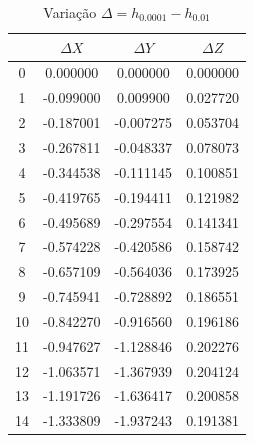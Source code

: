\documentclass[12pt, a4paper]{article}
\begin{document}
    \begin{table}[H]
        \centering
        \footnotesize
        \begin{tabular}{|c|c|c|c|}
        \toprule
            & $\Delta X$ & $\Delta Y$ & $\Delta Z$ \\
        \midrule
        0 & 0.000000 & 0.000000 & 0.000000 \\
        1 & -0.099000 & 0.009900 & 0.027720 \\
        2 & -0.187001 & -0.007275 & 0.053704 \\
        3 & -0.267811 & -0.048337 & 0.078073 \\
        4 & -0.344538 & -0.111145 & 0.100851 \\
        5 & -0.419765 & -0.194411 & 0.121982 \\
        6 & -0.495689 & -0.297554 & 0.141341 \\
        7 & -0.574228 & -0.420586 & 0.158742 \\
        8 & -0.657109 & -0.564036 & 0.173925 \\
        9 & -0.745941 & -0.728892 & 0.186551 \\
        10 & -0.842270 & -0.916560 & 0.196186 \\
        11 & -0.947627 & -1.128846 & 0.202276 \\
        12 & -1.063571 & -1.367939 & 0.204124 \\
        13 & -1.191726 & -1.636417 & 0.200858 \\
        14 & -1.333809 & -1.937243 & 0.191381 \\
        \bottomrule
        \end{tabular}
        \caption{Variação $\Delta = h_{0.0001} - h_{0.01}$}
    \end{table}
    
\end{document}
